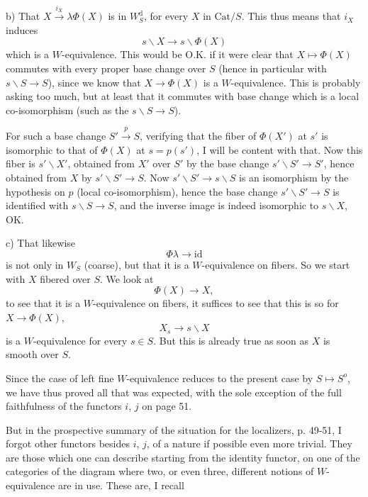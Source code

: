 b) That $X \xrightarrow{i_X} \lambda\Phi(X)$ is in $W_S^{\mathrm{d}}$, for every $X$ in $\mathrm{Cat}/S$. This thus means that $i_X$ induces
\[s\backslash X \longrightarrow s\backslash\Phi(X)\]
which is a $W$-equivalence. This would be O.K. if it were clear that $X \longmapsto \Phi(X)$ commutes with every proper base change over $S$ (hence in particular with $s\backslash S \longrightarrow S$), since we know that $X \longrightarrow \Phi(X)$ is a $W$-equivalence. This is probably asking too much, but at least that it commutes with base change which is a local co-isomorphism (such as the $s\backslash S \longrightarrow S$).

For such a base change $S' \xrightarrow{p} S$, verifying that the fiber of $\Phi(X')$ at $s'$ is isomorphic to that of $\Phi(X)$ at $s = p(s')$, I will be content with that. Now this fiber is $s'\backslash X'$, obtained from $X'$ over $S'$ by the base change $s'\backslash S' \longrightarrow S'$, hence obtained from $X$ by $s'\backslash S' \longrightarrow S$. Now $s'\backslash S' \longrightarrow s\backslash S$ is an isomorphism by the hypothesis
on $p$ (local co-isomorphism), hence the base change $s'\backslash S' \longrightarrow S$ is identified with $s\backslash S \longrightarrow S$, and the inverse image is indeed isomorphic to $s\backslash X$, OK.

c) That likewise
\[\Phi\lambda \longrightarrow \mathrm{id}\]
is not only in $W_S$ (coarse), but that it is a $W$-equivalence on fibers. So we start with $X$ fibered over $S$. We look at
\[\Phi(X) \longrightarrow X,\]
to see that it is a $W$-equivalence on fibers, it suffices to see that this is so for $X \longrightarrow \Phi(X)$,
\[X_s \longrightarrow s\backslash X\]
is a $W$-equivalence for every $s \in S$. But this is already true as soon as $X$ is smooth over $S$.

Since the case of left fine $W$-equivalence reduces to the present case by $S \longmapsto S^{o}$, we have thus proved all that was expected, with the sole exception of the full faithfulness of the functors $i$, $j$ on page 51. %

But in the prospective summary of the situation for the localizers, p. 49-51, I forgot other functors besides $i$, $j$, of a nature if possible even more trivial. They are
those which one can describe starting from the identity functor, on one of the categories of the diagram where two, or even three, different notions of $W$-equivalence are in use. These are, I recall

